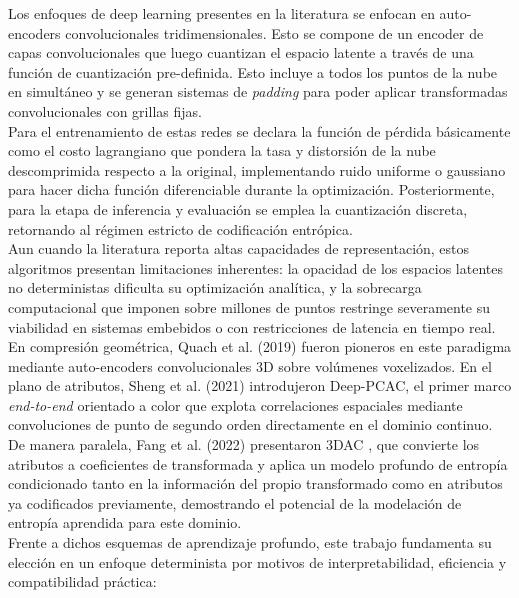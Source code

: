 Los enfoques de deep learning presentes en la literatura se enfocan en auto-encoders convolucionales tridimensionales. Esto se compone de un encoder de capas convolucionales que luego cuantizan el espacio latente a través de una función de cuantización pre-definida. Esto incluye a todos los puntos de la nube en simultáneo y se generan sistemas de \textit{padding} para poder aplicar transformadas convolucionales con grillas fijas. \\
    Para el entrenamiento de estas redes se declara la función de pérdida básicamente como el costo lagrangiano que pondera la tasa y distorsión de la nube descomprimida respecto a la original, implementando ruido uniforme o gaussiano para hacer dicha función diferenciable durante la optimización. Posteriormente, para la etapa de inferencia y evaluación se emplea la cuantización discreta, retornando al régimen estricto de codificación entrópica. \\
    Aun cuando la literatura reporta altas capacidades de representación, estos algoritmos presentan limitaciones inherentes: la opacidad de los espacios latentes no deterministas dificulta su optimización analítica, y la sobrecarga computacional que imponen sobre millones de puntos restringe severamente su viabilidad en sistemas embebidos o con restricciones de latencia en tiempo real. \\
    En compresión geométrica, Quach et al. (2019) \cite{quach2019learning} fueron pioneros en este paradigma mediante auto-encoders convolucionales 3D sobre volúmenes voxelizados. En el plano de atributos, Sheng et al. (2021) \cite{sheng2021deeppcac} introdujeron Deep-PCAC, el primer marco \textit{end-to-end} orientado a color que explota correlaciones espaciales mediante convoluciones de punto de segundo orden directamente en el dominio continuo. De manera paralela, Fang et al. (2022) presentaron 3DAC \cite{fang2022_3dac}, que convierte los atributos a coeficientes de transformada y aplica un modelo profundo de entropía condicionado tanto en la información del propio transformado como en atributos ya codificados previamente, demostrando el potencial de la modelación de entropía aprendida para este dominio. \\
    Frente a dichos esquemas de aprendizaje profundo, este trabajo fundamenta su elección en un enfoque determinista por motivos de interpretabilidad, eficiencia y compatibilidad práctica:

